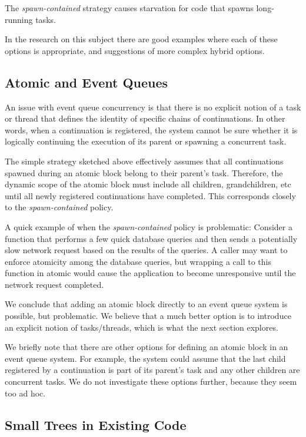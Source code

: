 \documentclass[acmsmall,anonymous,review]{acmart}\settopmatter{printfolios=true,printccs=false,printacmref=false}
\begin{document}
The \emph{spawn-contained} strategy causes starvation for code that spawns long-running tasks.



In the research on this subject there are good examples where each of these options is appropriate, and suggestions of more complex hybrid options.

\subsection{Atomic and Event Queues}

An issue with event queue concurrency is that there is no explicit notion of a task or thread that defines the identity of specific chains of continuations.
In other words, when a continuation is registered, the system cannot be sure whether it is logically continuing the execution of its parent or spawning a concurrent task.

The simple strategy sketched above effectively assumes that all continuations spawned during an atomic block belong to their parent's task.
Therefore, the dynamic scope of the atomic block must include all children, grandchildren, etc until all newly registered continuations have completed.
This corresponds closely to the \emph{spawn-contained} policy.

A quick example of when the \emph{spawn-contained} policy is problematic:
Consider a function that performs a few quick database queries and then sends a potentially slow network request based on the results of the queries.
A caller may want to enforce atomicity among the database queries, but wrapping a call to this function in atomic would cause the application to become unresponsive until the network request completed.

We conclude that adding an atomic block directly to an event queue system is possible, but problematic.
We believe that a much better option is to introduce an explicit notion of tasks/threads, which is what the next section explores.

We briefly note that there are other options for defining an atomic block in an event queue system.
For example, the system could assume that the last child registered by a continuation is part of its parent's task and any other children are concurrent tasks.
We do not investigate these options further, because they seem too ad hoc.

\subsection{Small Trees in Existing Code}
\end{document}
